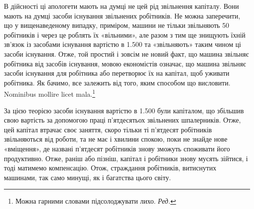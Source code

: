 В дійсності ці апологети мають на думці не цей рід звільнення
капіталу. Вони мають на думці засоби існування звільнених робітників.
Не можна заперечити, що у вищенаведеному випадку,
приміром, машини не тільки звільняють 50 робітників і через це
роблять їх «вільними», але разом з тим ще знищують їхній зв’язок
із засобами існування вартістю в 1.500 та
«звільняють» таким чином ці засоби існування. Отже, той простий
і зовсім не новий факт, що машина звільняє робітника від
засобів існування, мовою економістів означає, що машина звільняє
засоби існування для робітника або перетворює їх на капітал,
щоб уживати робітника. Як бачимо, все залежить від того, яким
способом що висловити. Nominibus mollire licet mala.\footnote*{
Можна гарними словами підсолоджувати лихо. \emph{Ред.}
}

За цією теорією засоби існування вартістю в 1.500 були капіталом, що збільшив свою вартість за допомогою
праці п’ятдесятьох звільнених шпалерників. Отже, цей
капітал втрачає своє заняття, скоро тільки ті п’ятдесят робітників
звільняються від роботи, та не має і хвилини спокою, поки
не знайде нове «вміщення», де названі п’ятдесят робітників
знову зможуть споживати його продуктивно. Отже, раніш або
пізніш, капітал і робітники знову мусять зійтися, і тоді матимемо
компенсацію. Отож, страждання робітників, витиснутих машинами,
так само минущі, як і багатства цього світу.

